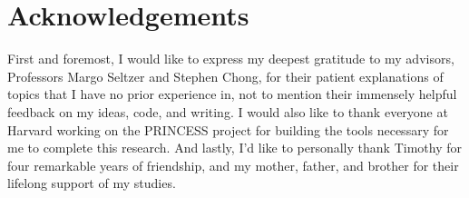 \documentclass[letterpaper,12pt]{article}
\begin{document}
\section{Acknowledgements}
First and foremost, I would like to express my deepest gratitude to my advisors, Professors Margo Seltzer and Stephen Chong, for their patient explanations of topics that I have no prior experience in, not to mention their immensely helpful feedback on my ideas, code, and writing. I would also like to thank everyone at Harvard working on the PRINCESS project for building the tools necessary for me to complete this research. And lastly, I'd like to personally thank Timothy for four remarkable years of friendship, and my mother, father, and brother for their lifelong support of my studies.

{\footnotesize 
}


\end{document}
